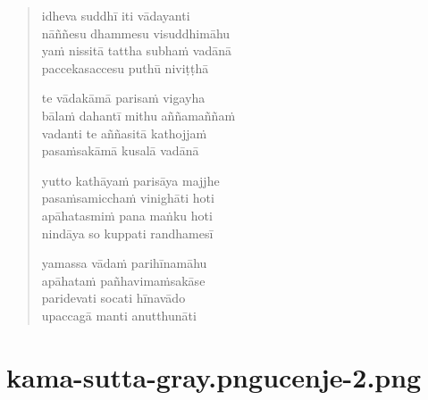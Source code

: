 

\cleartoverso

\vspace*{30mm}

\begin{verse}

idheva suddhī iti vādayanti\\
nāññesu dhammesu visuddhimāhu\\
yaṁ nissitā tattha subhaṁ vadānā\\
paccekasaccesu puthū niviṭṭhā

te vādakāmā parisaṁ vigayha\\
bālaṁ dahantī mithu aññamaññaṁ\\
vadanti te aññasitā kathojjaṁ\\
pasaṁsakāmā kusalā vadānā

yutto kathāyaṁ parisāya majjhe\\
pasaṁsamicchaṁ vinighāti hoti\\
apāhatasmiṁ pana maṅku hoti\\
nindāya so kuppati randhamesī

yamassa vādaṁ parihīnamāhu\\
apāhataṁ pañhavimaṁsakāse\\
paridevati socati hīnavādo\\
upaccagā manti anutthunāti

\end{verse}


\chapter[Pasūra Sutta]{{kama-sutta-gray.png}{ucenje-2.png}}

